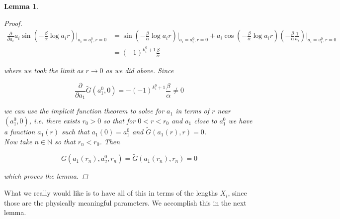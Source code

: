 \documentclass[12pt]{article}
\def\N{{\mathbb N}}
\newtheorem{lemma}{Lemma}
\begin{document}
\begin{lemma}
\begin{proof}
\begin{align*}
\frac{\partial}{\partial a_i} a_i \sin \left( - \frac{\beta}{\alpha} \log a_i r \right)\Big|_{a_i = a_i^0, r = 0}
&= \sin \left( - \frac{\beta}{\alpha} \log a_i r \right)\Big|_{a_i = a_i^0, r = 0} + a_i \cos \left( - \frac{\beta}{\alpha} \log a_i r \right)\left( -\frac{\beta}{\alpha} \frac{1}{a_i} \right) \Big|_{a_i = a_i^0, r = 0}\\
&=(-1)^{k_i^0 + 1}\frac{\beta}{\alpha}
\end{align*}

where we took the limit as $r \rightarrow 0$ as we did above. Since

\[
\frac{\partial}{\partial a_1} \tilde{G}(a_1^0, 0) = -(-1)^{k_1^0 + 1}\frac{\beta}{\alpha} \neq 0
\]

we can use the implicit function theorem to solve for $a_1$ in terms of $r$ near $(a_1^0, 0)$, i.e. there exists $r_0 > 0$ so that for $0 < r < r_0$ and $a_1$ close to $a_1^0$ we have a function $a_1(r)$ such that $a_1(0) = a_1^0$ and $\tilde{G}(a_1(r),r) = 0$.\\

Now take $n \in \N$ so that $r_n < r_0$. Then

\[
G(a_1(r_n), a_2^0, r_n) = \tilde{G}(a_1(r_n),r_n) = 0
\] 

which proves the lemma.

\end{proof}
\end{lemma}

What we really would like is to have all of this in terms of the lengths $X_i$, since those are the physically meaningful parameters. We accomplish this in the next lemma.

\end{document}
